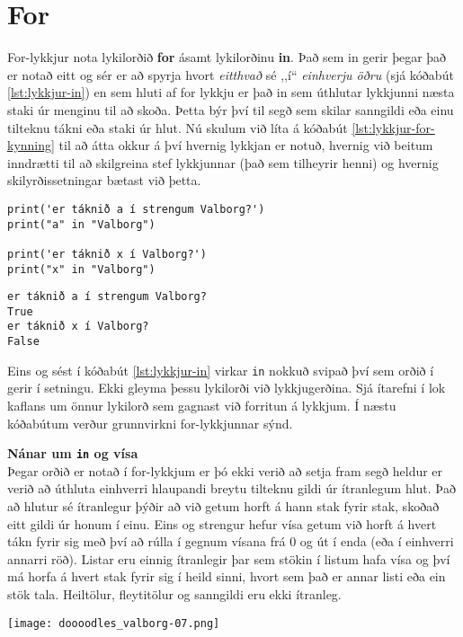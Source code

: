 \section{For}
For-lykkjur nota lykilorðið \textbf{for} ásamt lykilorðinu \textbf{in}.
Það sem in gerir þegar það er notað eitt og sér er að spyrja hvort \textit{eitthvað} sé ,,í“ \textit{einhverju öðru} (sjá kóðabút \ref{lst:lykkjur-in}) en sem hluti af for lykkju er það in sem úthlutar lykkjunni næsta staki úr menginu til að skoða.
Þetta býr því til segð sem skilar sanngildi eða einu tilteknu tákni eða staki úr hlut.
Nú skulum við líta á kóðabút \ref{lst:lykkjur-for-kynning} til að átta okkur á því hvernig lykkjan er notuð, hvernig við beitum inndrætti til að skilgreina stef lykkjunnar (það sem tilheyrir henni) og hvernig skilyrðissetningar bætast við þetta.

\begin{lstlisting}[caption=Lykilorðið in, label=lst:lykkjur-in]
print('er táknið a í strengum Valborg?')
print("a" in "Valborg")

print('er táknið x í Valborg?')
print("x" in "Valborg")
\end{lstlisting}
\lstset{style=uttak}
\begin{lstlisting}
er táknið a í strengum Valborg?
True
er táknið x í Valborg?
False
\end{lstlisting}
\lstset{style=venjulegt}

Eins og sést í kóðabút \ref{lst:lykkjur-in} virkar \texttt{in} nokkuð svipað því sem orðið í gerir í setningu.
Ekki gleyma þessu lykilorði við lykkjugerðina.
Sjá ítarefni í lok kaflans um önnur lykilorð sem gagnast við forritun á lykkjum.
Í næstu kóðabútum verður grunnvirkni for-lykkjunnar sýnd.
\vspace{1cm}
\begin{itarefni}
	\textbf{Nánar um \texttt{in} og vísa}\\
	Þegar orðið er notað í for-lykkjum er þó ekki verið að setja fram segð heldur er verið að úthluta einhverri hlaupandi breytu tilteknu gildi úr ítranlegum hlut.
	Það að hlutur sé ítranlegur þýðir að við getum horft á hann stak fyrir stak, skoðað eitt gildi úr honum í einu.
	Eins og strengur hefur vísa getum við horft á hvert tákn fyrir sig með því að rúlla í gegnum vísana frá 0 og út í enda (eða í einhverri annarri röð).
	Listar eru einnig ítranlegir þar sem stökin í listum hafa vísa og því má horfa á hvert stak fyrir sig í heild sinni, hvort sem það er annar listi eða ein stök tala.
	Heiltölur, fleytitölur og sanngildi eru ekki ítranleg.
\end{itarefni}
\vspace{2cm}
	\begin{center}
		\texttt{[image: doooodles\_valborg-07.png]}
	\end{center}

